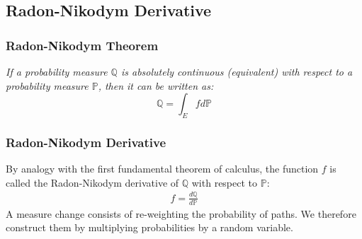 \subsection{Radon-Nikodym Derivative}

\subsubsection{Radon-Nikodym Theorem}
\textit{If a {\color{blue}probability measure} $\mathbb{Q}$ is {\color{blue}absolutely continuous (equivalent)} with respect to a probability measure $\mathbb{P}$, then it can be written as:}
\begin{equation}
	\mathbb{Q} = \int_{E}{fd\mathbb{P}}
\end{equation}
\subsubsection{Radon-Nikodym Derivative}
By analogy with the first fundamental theorem of calculus, the function $f$ is called the Radon-Nikodym derivative of $\mathbb{Q}$ with respect to $\mathbb{P}$:
\begin{eqnarray}
f = \frac{d\mathbb{Q}}{d\mathbb{P}}
\end{eqnarray}
A measure change consists of re-weighting the probability of paths. We therefore construct them by multiplying probabilities by a random variable.